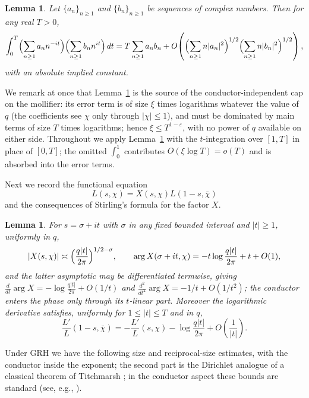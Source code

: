 \documentclass[10pt,a4paper]{amsart}
\newtheorem{lemma}[theorem]{Lemma}
\numberwithin{equation}{section}
\begin{document}
\begin{lemma}\label{lem:MV}
Let $\{a_n\}_{n\ge1}$ and $\{b_n\}_{n\ge1}$ be sequences of complex numbers. Then for any real $T>0$,
\[
\int_0^T\Bigl(\sum_{n\ge1}a_n n^{-it}\Bigr)\Bigl(\sum_{n\ge1}b_n n^{it}\Bigr)\,dt
=T\sum_{n\ge1}a_n b_n+O\!\left(\Bigl(\sum_{n\ge1}n|a_n|^2\Bigr)^{1/2}\Bigl(\sum_{n\ge1}n|b_n|^2\Bigr)^{1/2}\right),
\]
with an absolute implied constant.
\end{lemma}

We remark at once that Lemma~\ref{lem:MV} is the source of the conductor-independent cap on the mollifier: its error term is of size $\xi$ times logarithms whatever the value of $q$ (the coefficients see $\chi$ only through $|\chi|\le1$), and must be dominated by main terms of size $T$ times logarithms; hence $\xi\le T^{1-\varepsilon}$, with no power of $q$ available on either side. Throughout we apply Lemma~\ref{lem:MV} with the $t$-integration over $[1,T]$ in place of $[0,T]$; the omitted $\int_0^1$ contributes $O(\xi\log T)=o(T)$ and is absorbed into the error terms.

Next we record the functional equation
\begin{equation}\label{eq:FE}
L(s,\chi)=X(s,\chi)L(1-s,\bar\chi)
\end{equation}
and the consequences of Stirling's formula for the factor $X$.

\begin{lemma}\label{lem:Xfactor}
For $s=\sigma+it$ with $\sigma$ in any fixed bounded interval and $|t|\ge1$, uniformly in $q$,
\[
|X(s,\chi)|\asymp\Bigl(\frac{q|t|}{2\pi}\Bigr)^{1/2-\sigma},
\qquad
\arg X(\sigma+it,\chi)=-t\log\frac{q|t|}{2\pi}+t+O(1),
\]
and the latter asymptotic may be differentiated termwise, giving $\frac{d}{dt}\arg X=-\log\frac{q|t|}{2\pi}+O(1/t)$ and $\frac{d^2}{dt^2}\arg X=-1/t+O(1/t^2)$; the conductor enters the phase only through its $t$-linear part. Moreover the logarithmic derivative satisfies, uniformly for $1\le|t|\le T$ and in $q$,
\[
\frac{L'}{L}(1-s,\bar\chi)=-\frac{L'}{L}(s,\chi)-\log\frac{q|t|}{2\pi}+O\!\left(\frac1{|t|}\right).
\]
\end{lemma}

Under GRH we have the following size and reciprocal-size estimates, with the conductor inside the exponent; the second part is the Dirichlet analogue of a classical theorem of Titchmarsh \cite[Theorem~14.16]{Titchmarsh}; in the conductor aspect these bounds are standard (see, e.g., \cite[Ch.~5]{IK}).
\end{document}
